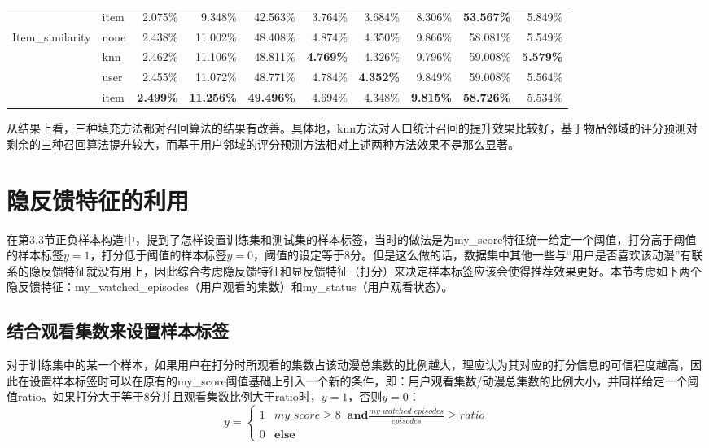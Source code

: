 \begin{table}[htbp]
{\begin{tabular}{rlrrrrrrrr}
			& item & 2.075\% & 9.348\% & 42.563\% & 3.764\% & 3.684\% & 8.306\% & \textbf{53.567\%} & 5.849\% \\
			\multicolumn{1}{l}{Item\_similarity} & none & 2.438\% & 11.002\% & 48.408\% & 4.874\% & 4.350\% & 9.866\% & 58.081\% & 5.549\% \\
			& knn  & 2.462\% & 11.106\% & 48.811\% & \textbf{4.769\%} & 4.326\% & 9.796\% & 59.008\% & \textbf{5.579\%} \\
			& user & 2.455\% & 11.072\% & 48.771\% & 4.784\% & \textbf{4.352\%} & 9.849\% & 59.008\% & 5.564\% \\
			& item & \textbf{2.499\%} & \textbf{11.256\%} & \textbf{49.496\%} & 4.694\% & 4.348\% & \textbf{9.815\%} & \textbf{58.726\%} & 5.534\% \\
			\bottomrule
	\end{tabular}}%
	\label{tab:missing_imputation_results_3}%
\end{table}%

从结果上看，三种填充方法都对召回算法的结果有改善。具体地，knn方法对人口统计召回的提升效果比较好，基于物品邻域的评分预测对剩余的三种召回算法提升较大，而基于用户邻域的评分预测方法相对上述两种方法效果不是那么显著。

\section{隐反馈特征的利用}
在第3.3节正负样本构造中，提到了怎样设置训练集和测试集的样本标签，当时的做法是为my\_score特征统一给定一个阈值，打分高于阈值的样本标签$y=1$，打分低于阈值的样本标签$y=0$，阈值的设定等于8分。但是这么做的话，数据集中其他一些与“用户是否喜欢该动漫”有联系的隐反馈特征就没有用上，因此综合考虑隐反馈特征和显反馈特征（打分）来决定样本标签应该会使得推荐效果更好。本节考虑如下两个隐反馈特征：my\_watched\_episodes（用户观看的集数）和my\_status（用户观看状态）。
\subsection{结合观看集数来设置样本标签}
对于训练集中的某一个样本，如果用户在打分时所观看的集数占该动漫总集数的比例越大，理应认为其对应的打分信息的可信程度越高，因此在设置样本标签时可以在原有的my\_score阈值基础上引入一个新的条件，即：用户观看集数/动漫总集数的比例大小，并同样给定一个阈值ratio。如果打分大于等于8分并且观看集数比例大于ratio时，$y=1$，否则$y=0$：
\begin{equation}
y=\begin{cases}
1 & my\_score\geq 8\;\;\textbf{and} \frac{my\_watched\_episodes}{episodes}\geq ratio \\
0 & \textbf{else}
\end{cases}
\end{equation}

